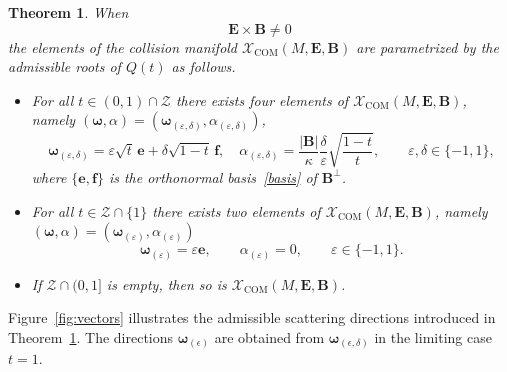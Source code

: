 \documentclass[10pt,a4paper]{amsart}
\newtheorem{theorem}{Theorem}[section]
\begin{document}
\begin{theorem}\label{quadraticreduction}
When
\[
{\bm E}\times{\bm B}\neq0
\]
the elements of the collision manifold $\mathcal{X}_\mathrm{COM}(M,{\bm E}, {\bm B})$ are parametrized by the admissible roots of $Q(t)$ as follows. 
\begin{itemize}
\item[(i)] For all $t\in(0,1)\cap\mathcal{Z}$ there exists four elements of  $\mathcal{X}_\mathrm{COM}(M,{\bm E}, {\bm B})$, namely $(\bm\omega,\alpha)=({\bm \omega}_{(\varepsilon,\delta)},\alpha_{(\varepsilon,\delta)})$, 
\[
{\bm \omega}_{(\varepsilon,\delta)}=\varepsilon\sqrt{t}\,{\bm e}+\delta\sqrt{1-t}\,{\bm f},\quad 
\alpha_{(\varepsilon,\delta)}=\frac{|{\bm B}|}{\kappa}\frac{\delta}{\varepsilon}\sqrt{\frac{1-t}{t}},\qquad\varepsilon,\delta\in\{-1,1\},
\]
where $\{{\bm e},{\bm f}\}$ is the orthonormal basis~\eqref{basis} of ${\bm B}^{\perp}$. 
\item[(ii)]
For all $t\in\mathcal{Z}\cap\{1\}$ there exists two elements of  $\mathcal{X}_\mathrm{COM}(M,{\bm E}, {\bm B})$, namely $(\bm\omega,\alpha)=({\bm \omega}_{(\varepsilon)},\alpha_{(\varepsilon)})$
\[
{\bm \omega}_{(\varepsilon)}=\varepsilon{\bm e},\qquad\alpha_{(\varepsilon)}=0,\qquad\varepsilon\in\{-1,1\}.
\]
\item If $\mathcal{Z}\cap (0,1]$ is empty, then so is $\mathcal{X}_\mathrm{COM}(M,{\bm E}, {\bm B})$.
\end{itemize}
\end{theorem}
Figure~\ref{fig:vectors} illustrates the admissible scattering directions introduced in Theorem~\ref{quadraticreduction}. The directions $\bm\omega_{(\epsilon)}$ are obtained from $\bm\omega_{(\epsilon,\delta)}$ in the limiting case $t=1$.
\end{document}
